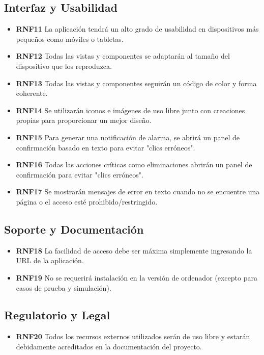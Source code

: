 \subsection{Interfaz y Usabilidad}
\begin{itemize}
    \item \textbf{RNF11} La aplicación tendrá un alto grado de usabilidad en dispositivos más pequeños como móviles o tabletas.
    \item \textbf{RNF12} Todas las vistas y componentes se adaptarán al tamaño del dispositivo que los reproduzca.
    \item \textbf{RNF13} Todas las vistas y componentes seguirán un código de color y forma coherente.
    \item \textbf{RNF14} Se utilizarán iconos e imágenes de uso libre junto con creaciones propias para proporcionar un mejor diseño.
    \item \textbf{RNF15} Para generar una notificación de alarma, se abrirá un panel de confirmación basado en texto para evitar "clics erróneos".
    \item \textbf{RNF16} Todas las acciones críticas como eliminaciones abrirán un panel de confirmación para evitar "clics erróneos".
    \item \textbf{RNF17} Se mostrarán mensajes de error en texto cuando no se encuentre una página o el acceso esté prohibido/restringido.
\end{itemize}

\subsection{Soporte y Documentación}
\begin{itemize}
    \item \textbf{RNF18} La facilidad de acceso debe ser máxima simplemente ingresando la URL de la aplicación.
    \item \textbf{RNF19} No se requerirá instalación en la versión de ordenador (excepto para casos de prueba y simulación).
\end{itemize}

\subsection{Regulatorio y Legal}
\begin{itemize}
    \item \textbf{RNF20} Todos los recursos externos utilizados serán de uso libre y estarán debidamente acreditados en la documentación del proyecto.
\end{itemize}